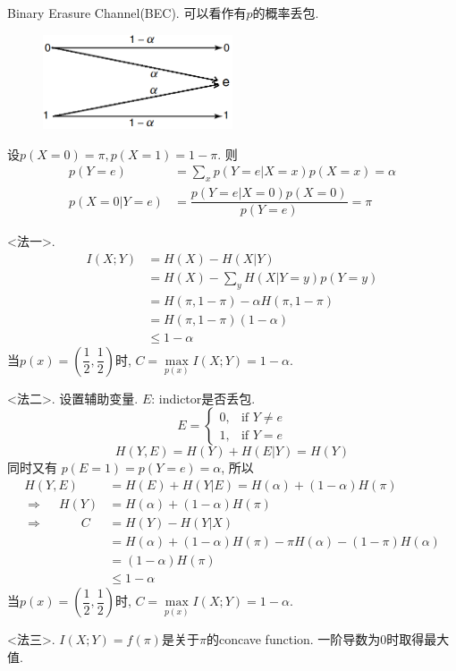 \begin{example}
Binary Erasure Channel(BEC). 可以看作有$p$的概率丢包.
\begin{figure}[htbp]
    \centering
    \includegraphics[width=0.5\textwidth]{./figures/chapter5/BEC.png}
\end{figure}

设$p(X=0)=\pi, p(X=1)=1-\pi$. 则
\begin{align*}
p(Y=e) &= \sum_xp(Y=e|X=x)p(X=x)=\alpha \\
p(X=0|Y=e) &= \dfrac{p(Y=e|X=0)p(X=0)}{p(Y=e)}=\pi
\end{align*}

<法一>.
\begin{align*}
    I(X;Y) &= H(X) - H(X|Y) \\
    &= H(X) - \sum_{y}H(X|Y=y)p(Y=y) \\
    &= H\left(\pi,1-\pi\right) - \alpha H\left(\pi,1-\pi\right) \\
    &= H\left(\pi,1-\pi\right)(1-\alpha) \\
    &\leq 1-\alpha
\end{align*}
当$p(x)=\left(\dfrac{1}{2},\dfrac{1}{2}\right)$时, $C=\max\limits_{p(x)}I(X;Y)=1-\alpha$.

<法二>. 设置辅助变量. $E$: indictor是否丢包.
$$E=\begin{cases}
    0, & \text{if } Y\neq e \\
    1, & \text{if } Y=e
\end{cases}$$
$$H(Y,E)=H(Y)+H(E|Y)=H(Y)$$
同时又有 $p(E=1)=p(Y=e)=\alpha$, 所以
\begin{align*}
H(Y,E) &= H(E)+H(Y|E)=H(\alpha)+(1-\alpha)H(\pi) \\
\Rightarrow \quad\ H(Y) &= H(\alpha)+(1-\alpha)H(\pi) \\
\Rightarrow \qquad\quad C &= H(Y) - H(Y|X) \\
&= H(\alpha)+(1-\alpha)H(\pi) - \pi H(\alpha) - (1-\pi)H(\alpha) \\
&= (1-\alpha)H(\pi) \\
&\leq 1-\alpha
\end{align*}
当$p(x)=\left(\dfrac{1}{2},\dfrac{1}{2}\right)$时, $C=\max\limits_{p(x)}I(X;Y)=1-\alpha$.

<法三>. $I(X;Y)=f(\pi)$是关于$\pi$的concave function. 一阶导数为0时取得最大值.
\end{example}


